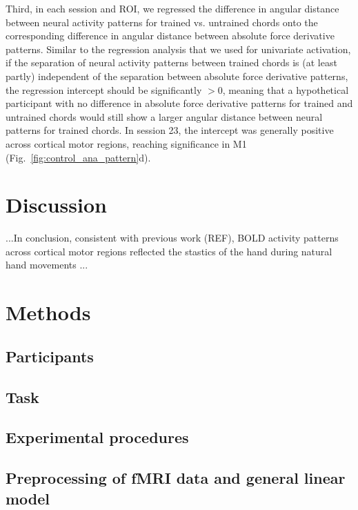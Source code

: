 \documentclass{article}
\begin{document}
Third, in each session and ROI, we regressed the difference in angular distance between neural activity patterns for trained vs. untrained chords onto the corresponding difference in angular distance between absolute force derivative patterns. Similar to the regression analysis that we used for univariate activation, if the separation of neural activity patterns between trained chords is (at least partly) independent of the separation between absolute force derivative patterns, the regression intercept should be significantly $>0$, meaning that a hypothetical participant with no difference in absolute force derivative patterns for trained and untrained chords would still show a larger angular distance between neural patterns for trained chords. In session 23, the intercept was generally positive across cortical motor regions, reaching significance in M1 (Fig.~\ref{fig:control_ana_pattern}d).

\section{Discussion}

...In conclusion, consistent with previous work (REF), BOLD activity patterns across cortical motor regions reflected the stastics of the hand during natural hand movements ...

\section{Methods}

\subsection{Participants}

\subsection{Task}

\subsection{Experimental procedures}

\subsection{Preprocessing of fMRI data and general linear model}
\end{document}
